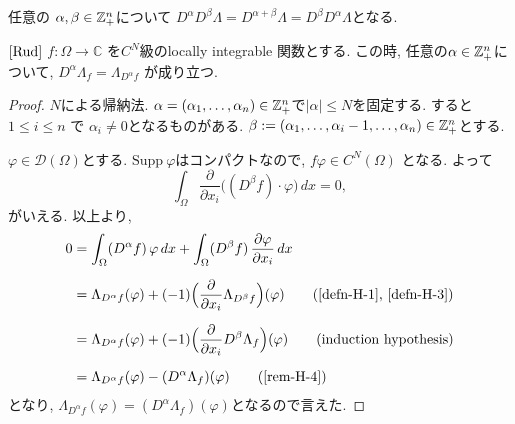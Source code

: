 \begin{rem}
\label{rem-H-4}
任意の \(\alpha, \beta \in \mathbb{Z}_+^n\)について \(D^\alpha D^\beta \Lambda = D^{\alpha + \beta} \Lambda = D^\beta D^\alpha \Lambda\)となる. 
\end{rem}

\begin{tcolorbox}[mybox]
\begin{lem}{$\cite[6.13]{Rud}$}
\label{lem-H-5}
\(f : \Omega \to \mathbb{C}\) を$C^N$級のlocally integrable 関数とする.
この時, 任意の$\alpha \in \mathbb{Z}_+^n$について, \(D^\alpha \Lambda_f = \Lambda_{D^\alpha f}\) 
が成り立つ. 
\end{lem}
\end{tcolorbox}

\begin{proof}
 \(N\)による帰納法. 
\(\alpha = (\alpha_1, \dots, \alpha_n) \in \mathbb{Z}_+^n\)で\(|\alpha| \le N\)を固定する. 
すると\(1 \le i \le n\) で \(\alpha_i \neq 0\)となるものがある. 
 \(\beta := (\alpha_1, \dots, \alpha_i - 1, \dots, \alpha_n) \in \mathbb{Z}_+^n\)とする. 

$\varphi \in \mathcal{D}(\Omega)$とする. 
\(\mathrm{Supp} \ \varphi\)はコンパクトなので,  \(f\varphi \in C^N(\Omega)\)
となる. よって
\[
\int_\Omega \frac{\partial}{\partial x_i} \big( (D^\beta f) \cdot \varphi \big) \, dx = 0,
\]
がいえる. 
以上より, 
\begin{align}
0 &= \int_{\Omega} (D^{\alpha} f)\,\varphi\,dx
   + \int_{\Omega} (D^{\beta} f)\,\frac{\partial\varphi}{\partial x_i}\,dx \notag \\[6pt]
&= \Lambda_{D^{\alpha} f}(\varphi)
   + (-1)\Bigl(\frac{\partial}{\partial x_i}\Lambda_{D^{\beta} f}\Bigr)(\varphi)
   \tag*{\text{(\ref{defn-H-1}, \ref{defn-H-3})}} \\[6pt]
&= \Lambda_{D^{\alpha} f}(\varphi)
   + (-1)\Bigl(\frac{\partial}{\partial x_i}D^{\beta}\Lambda_f\Bigr)(\varphi)
   \tag*{\text{(induction hypothesis)}} \\[6pt]
&= \Lambda_{D^{\alpha} f}(\varphi)
   - (D^{\alpha}\Lambda_f)(\varphi)
   \tag*{\text{(\ref{rem-H-4})}}
\end{align}
となり, $\Lambda_{D^{\alpha} f}(\varphi) = (D^{\alpha}\Lambda_f)(\varphi)$となるので言えた. 
\end{proof}

